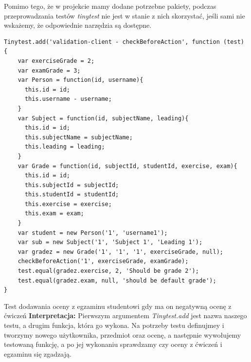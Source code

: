 \documentclass{xmgr}
\begin{document}
Pomimo tego, że w projekcie mamy dodane potrzebne pakiety, podczas przeprowadzania testów \textit{tinytest} nie jest w stanie z nich skorzystać, jeśli sami nie wskażemy, że odpowiednie narzędzia są dostępne.

\begin{listing}[H]
\begin{verbatim}
Tinytest.add('validation-client - checkBeforeAction', function (test) {
    var exerciseGrade = 2;
    var examGrade = 3;
    var Person = function(id, username){
      this.id = id;
      this.username - username;
    }
    var Subject = function(id, subjectName, leading){
      this.id = id;
      this.subjectName = subjectName;
      this.leading = leading;
    }
    var Grade = function(id, subjectId, studentId, exercise, exam){
      this.id = id;
      this.subjectId = subjectId;
      this.studentId = studentId;
      this.exercise = exercise;
      this.exam = exam;
    }
    var student = new Person('1', 'username1');
    var sub = new Subject('1', 'Subject 1', 'Leading 1');
    var gradez = new Grade('1', '1', '1', exerciseGrade, null);
    checkBeforeAction('1', exerciseGrade, examGrade);
    test.equal(gradez.exercise, 2, 'Should be grade 2');
    test.equal(gradez.exam, null, 'should be default grade');
}
\end{verbatim}
\caption{Test dodawania oceny z egzaminu studentowi gdy ma on negatywną ocenę z ćwiczeń \newline \newline \hspace{\linewidth} \textbf{Interpretacja:} Pierwszym argumentem \textit{Tinytest.add} jest nazwa naszego testu, a drugim  funkcja, która go wykona. Na potrzeby testu definujmey i tworzymy nowego użytkownika, przedmiot oraz ocenę, a następnie wywołujemy testowaną funkcję, a po jej wykonaniu sprawdzamy czy oceny z ćwiczeń i egzaminu się zgadzają.\cite{TinyTest}  \newline}
\end{listing}
\end{document}
